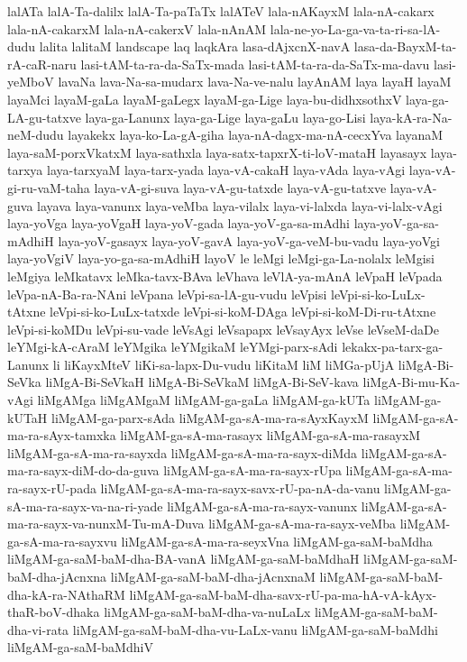 {lalATa
lalA-Ta-dalilx
lalA-Ta-paTaTx
lalATeV
lala-nAKayxM
lala-nA-cakarx
lala-nA-cakarxM
lala-nA-cakerxV
lala-nAnAM
lala-ne-yo-La-ga-va-ta-ri-sa-lA-dudu
lalita
lalitaM
landscape
laq
laqkAra
lasa-dAjxcnX-navA
lasa-da-BayxM-ta-rA-caR-naru
lasi-tAM-ta-ra-da-SaTx-mada
lasi-tAM-ta-ra-da-SaTx-ma-davu
lasi-yeMboV
lavaNa
lava-Na-sa-mudarx
lava-Na-ve-nalu
layAnAM
laya
layaH
layaM
layaMci
layaM-gaLa
layaM-gaLegx
layaM-ga-Lige
laya-bu-didhxsothxV
laya-ga-LA-gu-tatxve
laya-ga-Lanunx
laya-ga-Lige
laya-gaLu
laya-go-Lisi
laya-kA-ra-Na-neM-dudu
layakekx
laya-ko-La-gA-giha
laya-nA-dagx-ma-nA-cecxYva
layanaM
laya-saM-porxVkatxM
laya-sathxla
laya-satx-tapxrX-ti-loV-mataH
layasayx
laya-tarxya
laya-tarxyaM
laya-tarx-yada
laya-vA-cakaH
laya-vAda
laya-vAgi
laya-vA-gi-ru-vaM-taha
laya-vA-gi-suva
laya-vA-gu-tatxde
laya-vA-gu-tatxve
laya-vA-guva
layava
laya-vanunx
laya-veMba
laya-vilalx
laya-vi-lalxda
laya-vi-lalx-vAgi
laya-yoVga
laya-yoVgaH
laya-yoV-gada
laya-yoV-ga-sa-mAdhi
laya-yoV-ga-sa-mAdhiH
laya-yoV-gasayx
laya-yoV-gavA
laya-yoV-ga-veM-bu-vadu
laya-yoVgi
laya-yoVgiV
laya-yo-ga-sa-mAdhiH
layoV
le
leMgi
leMgi-ga-La-nolalx
leMgisi
leMgiya
leMkatavx
leMka-tavx-BAva
leVhava
leVlA-ya-mAnA
leVpaH
leVpada
leVpa-nA-Ba-ra-NAni
leVpana
leVpi-sa-lA-gu-vudu
leVpisi
leVpi-si-ko-LuLx-tAtxne
leVpi-si-ko-LuLx-tatxde
leVpi-si-koM-DAga
leVpi-si-koM-Di-ru-tAtxne
leVpi-si-koMDu
leVpi-su-vade
leVsAgi
leVsapapx
leVsayAyx
leVse
leVseM-daDe
leYMgi-kA-cAraM
leYMgika
leYMgikaM
leYMgi-parx-sAdi
lekakx-pa-tarx-ga-Lanunx
li
liKayxMteV
liKi-sa-lapx-Du-vudu
liKitaM
liM
liMGa-pUjA
liMgA-Bi-SeVka
liMgA-Bi-SeVkaH
liMgA-Bi-SeVkaM
liMgA-Bi-SeV-kava
liMgA-Bi-mu-Ka-vAgi
liMgAMga
liMgAMgaM
liMgAM-ga-gaLa
liMgAM-ga-kUTa
liMgAM-ga-kUTaH
liMgAM-ga-parx-sAda
liMgAM-ga-sA-ma-ra-sAyxKayxM
liMgAM-ga-sA-ma-ra-sAyx-tamxka
liMgAM-ga-sA-ma-rasayx
liMgAM-ga-sA-ma-rasayxM
liMgAM-ga-sA-ma-ra-sayxda
liMgAM-ga-sA-ma-ra-sayx-diMda
liMgAM-ga-sA-ma-ra-sayx-diM-do-da-guva
liMgAM-ga-sA-ma-ra-sayx-rUpa
liMgAM-ga-sA-ma-ra-sayx-rU-pada
liMgAM-ga-sA-ma-ra-sayx-savx-rU-pa-nA-da-vanu
liMgAM-ga-sA-ma-ra-sayx-va-na-ri-yade
liMgAM-ga-sA-ma-ra-sayx-vanunx
liMgAM-ga-sA-ma-ra-sayx-va-nunxM-Tu-mA-Duva
liMgAM-ga-sA-ma-ra-sayx-veMba
liMgAM-ga-sA-ma-ra-sayxvu
liMgAM-ga-sA-ma-ra-seyxVna
liMgAM-ga-saM-baMdha
liMgAM-ga-saM-baM-dha-BA-vanA
liMgAM-ga-saM-baMdhaH
liMgAM-ga-saM-baM-dha-jAcnxna
liMgAM-ga-saM-baM-dha-jAcnxnaM
liMgAM-ga-saM-baM-dha-kA-ra-NAthaRM
liMgAM-ga-saM-baM-dha-savx-rU-pa-ma-hA-vA-kAyx-thaR-boV-dhaka
liMgAM-ga-saM-baM-dha-va-nuLaLx
liMgAM-ga-saM-baM-dha-vi-rata
liMgAM-ga-saM-baM-dha-vu-LaLx-vanu
liMgAM-ga-saM-baMdhi
liMgAM-ga-saM-baMdhiV
}
